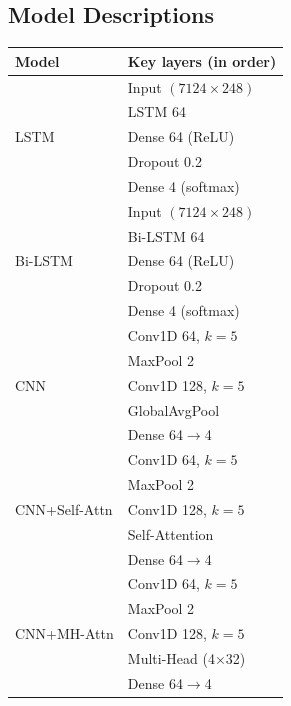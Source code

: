 \documentclass[conference]{IEEEtran}
\begin{document}
\subsection{Model Descriptions}
\begin{tabular}{ll}
    \toprule
    Model & Key layers (in order) \\
    \midrule
    \multirow{5}{*}{LSTM}            & Input $(7124{\times}248)$\\
                                     & LSTM 64\\
                                     & Dense 64 (ReLU)\\
                                     & Dropout 0.2\\
                                     & Dense 4 (softmax)\\
    \midrule
    \multirow{5}{*}{Bi-LSTM}         & Input $(7124{\times}248)$\\
                                     & Bi-LSTM 64\\
                                     & Dense 64 (ReLU)\\
                                     & Dropout 0.2\\
                                     & Dense 4 (softmax)\\
    \midrule
    \multirow{5}{*}{CNN}             & Conv1D 64, $k{=}5$\\
                                     & MaxPool 2\\
                                     & Conv1D 128, $k{=}5$\\
                                     & GlobalAvgPool\\
                                     & Dense 64$\rightarrow$4\\
    \midrule
    \multirow{5}{*}{CNN+Self-Attn}   & Conv1D 64, $k{=}5$\\
                                     & MaxPool 2\\
                                     & Conv1D 128, $k{=}5$\\
                                     & Self-Attention\\
                                     & Dense 64$\rightarrow$4\\
    \midrule
    \multirow{5}{*}{CNN+MH-Attn}     & Conv1D 64, $k{=}5$\\
                                     & MaxPool 2\\
                                     & Conv1D 128, $k{=}5$\\
                                     & Multi-Head (4$\times$32)\\
                                     & Dense 64$\rightarrow$4\\
    \bottomrule
    \end{tabular}
\end{document}
